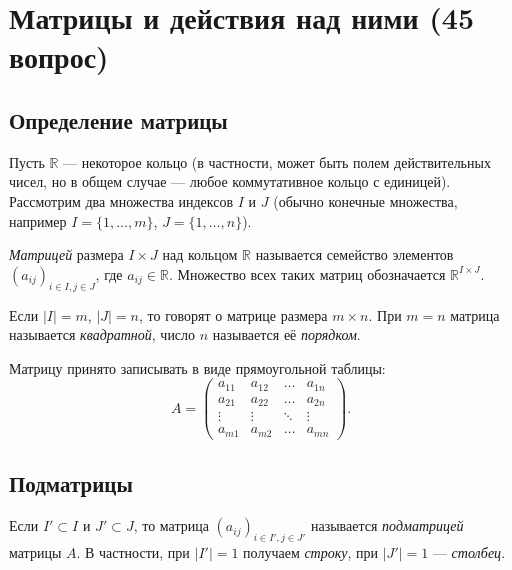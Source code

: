 \documentclass[a4paper,12pt]{article}
\theoremstyle{definition}
\theoremstyle{plain}
\theoremstyle{remark}
\begin{document}
	
	
	
	
	
	\newpage
	\section{Матрицы и действия над ними (45 вопрос)}
	
	\subsection{Определение матрицы}
	
	Пусть \( \mathbb{R} \) — некоторое кольцо (в частности, может быть полем действительных чисел, но в общем случае — любое коммутативное кольцо с единицей). Рассмотрим два множества индексов \( I \) и \( J \) (обычно конечные множества, например \( I = \{1, \dots, m\} \), \( J = \{1, \dots, n\} \)).
	
	\begin{tcolorbox}[colback=blue!5, colframe=blue!40!black, title=Определение]
		\textit{Матрицей} размера \( I \times J \) над кольцом \( \mathbb{R} \) называется семейство элементов \( (a_{ij})_{i \in I, j \in J} \), где \( a_{ij} \in \mathbb{R} \). Множество всех таких матриц обозначается \( \mathbb{R}^{I \times J} \).
	\end{tcolorbox}
	
	Если \( |I| = m \), \( |J| = n \), то говорят о матрице размера \( m \times n \). При \( m = n \) матрица называется \textit{квадратной}, число \( n \) называется её \textit{порядком}.
	
	Матрицу принято записывать в виде прямоугольной таблицы:
	\[
	A = 
	\begin{pmatrix}
		a_{11} & a_{12} & \dots & a_{1n} \\
		a_{21} & a_{22} & \dots & a_{2n} \\
		\vdots & \vdots & \ddots & \vdots \\
		a_{m1} & a_{m2} & \dots & a_{mn}
	\end{pmatrix}.
	\]
	
	\subsection{Подматрицы}
	
	Если \( I' \subset I \) и \( J' \subset J \), то матрица \( (a_{ij})_{i \in I', j \in J'} \) называется \textit{подматрицей} матрицы \( A \). В частности, при \( |I'| = 1 \) получаем \textit{строку}, при \( |J'| = 1 \) — \textit{столбец}.
	
\end{document}
